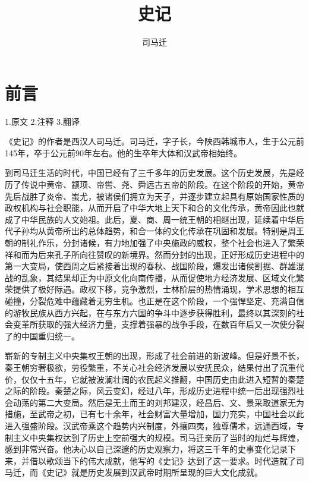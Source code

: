 \documentclass[12pt,UTF8]{ctexbook}
\title{\heiti\zihao{0} 史记}
\author{司马迁}
\date{}
\begin{document}
\maketitle
\tableofcontents

\frontmatter
\chapter{前言}

1.原文
2.注释
3.翻译

《史记》的作者是西汉人司马迁。司马迁，字子长，今陕西韩城市人，生于公元前145年，卒于公元前90年左右。他的生卒年大体和汉武帝相始终。

到司马迁生活的时代，中国已经有了三千多年的历史发展。这个历史发展，先是经历了传说中黄帝、颛顼、帝喾、尧、舜远古五帝的阶段。在这个阶段的开始，黄帝先后战胜了炎帝、蚩尤，被诸侯们拥立为天子，并逐步建立起具有原始国家性质的政权机构与社会职能，从而开启了中华大地上天下和合的文化传承，黄帝因此也就成了中华民族的人文始祖。此后，夏、商、周一统王朝的相继出现，延续着中华后代子孙均从黄帝所出的总体趋势，和合一体的文化传承在巩固和发展。特别是周王朝的制礼作乐，分封诸候，有力地加强了中央施政的威权，整个社会也进入了繁荣祥和而为后来孔子所向往赞叹的新境界。然而分封的出现，正好形成历史进程中的第一大变局，使西周之后紧接着出现的春秋、战国阶段，爆发出诸侯割据、群雄混战的乱象，其结果却正为中原文化向南传播，从而促使地方经济发展、区域文化繁荣提供了极好际遇。政权下移，竞争激烈，士林阶层的热情涌现，学术思想的相互碰撞，分裂危难中蕴藏着无穷生机。也正是在这个阶段，一个强悍坚定、充满自信的游牧民族从西方兴起，在与东方六国的争斗中逐步获得胜利，最终以其深刻的社会变革所获取的强大经济力量，支撑着强暴的战争手段，在数百年后又一次使分裂了的中国重归统一。

崭新的专制主义中央集权王朝的出现，形成了社会前进的新波峰。但是好景不长，秦王朝穷奢极欲，劳役繁重，不关心社会经济发展以安抚民众，结果付出了沉重代价，仅仅十五年，它就被波澜壮阔的农民起义推翻，中国历史由此进入短暂的秦楚之际的阶段。秦楚之际，风云变幻，经过八年，形成历史进程中统一后出现强烈社会动荡的第二大变局。然后是无土而王的刘邦建汉，经昌后、文、景采取道家无为措施，至武帝之初，已有七十余年，社会财富大量增加，国力充实，中国社会以此进入强盛阶段。汉武帝乘这个趋势内兴制度，外攘四夷，独尊儒术，远通西域，专制主义中央集权达到了历史上空前强大的规模。司马迁亲历了当时的灿烂与辉煌，感到非常兴奋。他决心以自己深邃的历史观察力，将这三千年的史事变化记录下来，并借以歌颂当下的伟大成就，他写的《史记》达到了这一要求。时代造就了司马迁，而《史记》就是历史发展到汉武帝时期所呈现的巨大文化成就。
\end{document}
